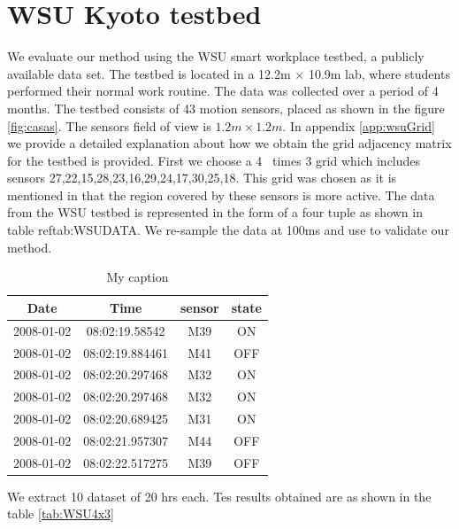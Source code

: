 \section{WSU Kyoto testbed}
We evaluate our method using the WSU smart workplace testbed\cite{cook2010detection}, a publicly available data set. The testbed is located in a 12.2m $\times$ 10.9m  lab,  where students performed their normal work routine. The data was collected over a period of 4 months. 
The testbed consists of 43 motion sensors, placed as shown in the figure \ref{fig:casas}. The sensors field of view is $1.2m \times 1.2m$. In appendix \ref{app:wsuGrid} we provide a detailed explanation about how we obtain the grid adjacency matrix for the testbed is provided.
First we choose a 4 \ times 3 grid which includes sensors 27,22,15,28,23,16,29,24,17,30,25,18. This grid was chosen as it is mentioned in \cite{cook2010detection} that the region covered by these sensors is more active.
The data from the WSU testbed is represented in the form of a four tuple as shown in table ref{tab:WSUDATA}. We re-sample the data at 100ms and use to validate our method.

\begin{table}[]
\centering
\caption{My caption}
\label{tab:WSUDATA}
\begin{tabular}{|c|c|c|c|}
\hline
Date       & Time            & sensor & state \\ \hline
2008-01-02 & 08:02:19.58542  & M39    & ON    \\ \hline
2008-01-02 & 08:02:19.884461 & M41    & OFF   \\ \hline
2008-01-02 & 08:02:20.297468 & M32    & ON    \\ \hline
2008-01-02 & 08:02:20.297468 & M32    & ON    \\ \hline
2008-01-02 & 08:02:20.689425 & M31    & ON    \\ \hline
2008-01-02 & 08:02:21.957307 & M44    & OFF   \\ \hline
2008-01-02 & 08:02:22.517275 & M39    & OFF   \\ \hline
\end{tabular}
\end{table}

We extract 10 dataset of 20 hrs each. Tes results obtained are as shown in the table \ref{tab:WSU4x3}

